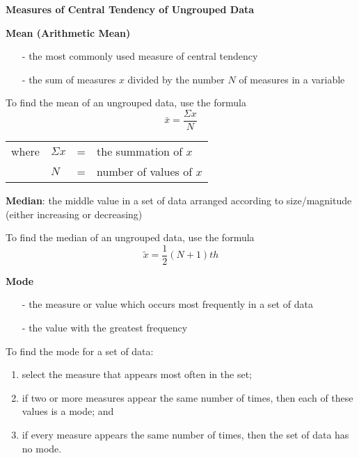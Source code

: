 \begin{center}
\textbf{Measures of Central Tendency of Ungrouped Data 
}
\end{center}

\vspace*{1ex}

\textbf{Mean (Arithmetic Mean)}
\begin{itemize}
\item[-] the most commonly used measure of central tendency

\item[-] the sum of measures $x$ divided by the number $N$ of measures in a variable
\end{itemize}  

\vspce 

To find the mean of an ungrouped data, use the formula
\[
\bar{x} = \displaystyle \frac{\Sigma x}{N} 
\] 

\begin{center}

\begin{tabular}{llcl}

where & $\Sigma x$ & = & the summation of $x$ \\

& $N$ & = & number of values of $x$ \\

\end{tabular} 
\end{center} 

\vspce 

\textbf{Median}: the middle value in a set of data arranged according to size/magnitude (either increasing or decreasing) 

\vspce 

To find the median of an ungrouped data, use the formula
\[
\tilde{x} = \displaystyle \frac{1}{2}(N+1)th
\] 

\vspce 

\textbf{Mode}
\begin{itemize} 
\item[-] the measure or value which occurs most frequently in a set of data
\item[-] the value with the greatest frequency
\end{itemize}  

To find the mode for a set of data:
\begin{enumerate}[label = \arabic*. ]
\item select the measure that appears most often in the set; 
\item if two or more measures appear the same number of times, then each of these 
values is a mode; and
\item if every measure appears the same number of times, then the set of data has no 
mode.
\end{enumerate}   

